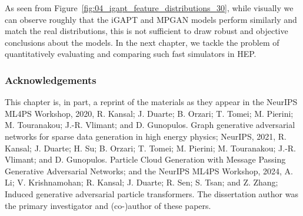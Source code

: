 As seen from Figure~\ref{fig:04_igapt_feature_distributions_30}, while visually we can observe roughly that the iGAPT and MPGAN models perform similarly and match the real distributions, this is not sufficient to draw robust and objective conclusions about the models.
In the next chapter, we tackle the problem of quantitatively evaluating and comparing such fast simulators in HEP.

\subsubsection{Acknowledgements}

This chapter is, in part, a reprint of the materials as they appear in the NeurIPS ML4PS Workshop, 2020, R. Kansal; J. Duarte; B. Orzari; T. Tomei; M. Pierini; M. Touranakou; J.-R. Vlimant; and D. Gunopulos. Graph generative adversarial networks for sparse data generation in high energy physics;
NeurIPS, 2021, R. Kansal; J. Duarte; H. Su; B. Orzari; T. Tomei; M. Pierini; M. Touranakou; J.-R. Vlimant; and D. Gunopulos. Particle Cloud Generation with Message Passing Generative Adversarial Networks; and
the NeurIPS ML4PS Workshop, 2024, A. Li; V. Krishnamohan; R. Kansal; J. Duarte; R. Sen; S. Tsan; and Z. Zhang; Induced generative adversarial particle transformers.
The dissertation author was the primary investigator and (co-)author of these papers.